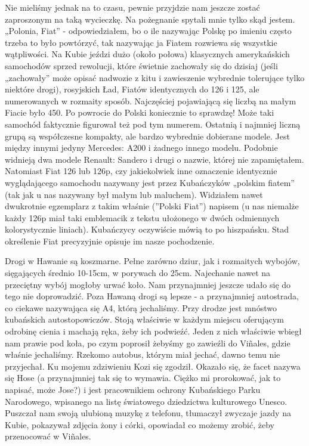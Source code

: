 Nie mieliśmy jednak na to czasu, pewnie przyjdzie nam jeszcze zostać zaproszonym na taką wycieczkę.
Na pożegnanie spytali mnie tylko skąd jestem.
„Polonia, Fiat” - odpowiedziałem, bo o ile nazywając Polskę po imieniu często trzeba to było powtórzyć, tak nazywając ja Fiatem rozwiewa się wszystkie wątpliwości.
Na Kubie jeździ dużo (około połowa) klasycznych amerykańskich samochodów sprzed rewolucji, które świetnie zachowały się do dzisiaj (jeśli „zachowały” może opisać nadwozie z kitu i zawieszenie wybrednie tolerujące tylko niektóre drogi), rosyjskich Ład, Fiatów identycznych do 126 i 125, ale numerowanych w rozmaity sposób.
Najczęściej pojawiającą się liczbą na małym Fiacie było 450.
Po powrocie do Polski koniecznie to sprawdzę!
Może taki samochód faktycznie figurował też pod tym numerem.
Ostatnią i najmniej liczną grupą są współczesne kompakty, ale bardzo wybrednie dobierane modele.
Jest między innymi jedyny Mercedes: A200 i żadnego innego modelu.
Podobnie widnieją dwa modele Renault: Sandero i drugi o nazwie, której nie zapamiętałem.
Natomiast Fiat 126 lub 126p, czy jakiekolwiek inne oznaczenie identycznie wyglądającego samochodu nazywany jest przez Kubańczyków „polskim fiatem” (tak jak u nas nazywany był małym lub maluchem).
Widziałem nawet dwukrotnie egzemplarz z takim właśnie (”Polski Fiat”) napisem (u nas niemalże każdy 126p miał taki emblemacik z tekstu ułożonego w dwóch odmiennych kolorystycznie liniach).
Kubańczycy oczywiście mówią to po hiszpańsku.
Stad określenie Fiat precyzyjnie opisuje im nasze pochodzenie.
\par Drogi w Hawanie są koszmarne.
Pełne zarówno dziur, jak i rozmaitych wybojów, sięgających średnio 10-15cm, w porywach do 25cm.
Najechanie nawet na przeciętny wybój mogłoby urwać koło.
Nam przynajmniej jeszcze udało się do tego nie doprowadzić.
Poza Hawaną drogi są lepsze - a przynajmniej autostrada, co ciekawe nazywająca się A4, którą jechaliśmy.
Przy drodze jest mnóstwo kubańskich autostopowiczów.
Stoją właściwie w każdym miejscu oferującym odrobinę cienia i machają ręka, żeby ich podwieźć.
Jeden z nich właściwie wbiegł nam prawie pod koła, po czym poprosił żebyśmy go zawieźli do Viñales, gdzie właśnie jechaliśmy. Rzekomo autobus, którym miał jechać, dawno temu nie przyjechał.
Ku mojemu zdziwieniu Kozi się zgodził.
Okazało się, że facet nazywa się Hose (a przynajmniej tak się to wymawia.
Ciężko mi prorokować, jak to napisać, może Jose?) i jest pracownikiem ochrony Kubańskiego Parku Narodowego, wpisanego na listę światowego dziedzictwa kulturowego Unesco.
Puszczał nam swoją ulubioną muzykę z telefonu, tłumaczył zwyczaje jazdy na Kubie, pokazywał zdjęcia żony i córki, opowiadał co możemy zrobić, żeby przenocować w Viñales.
